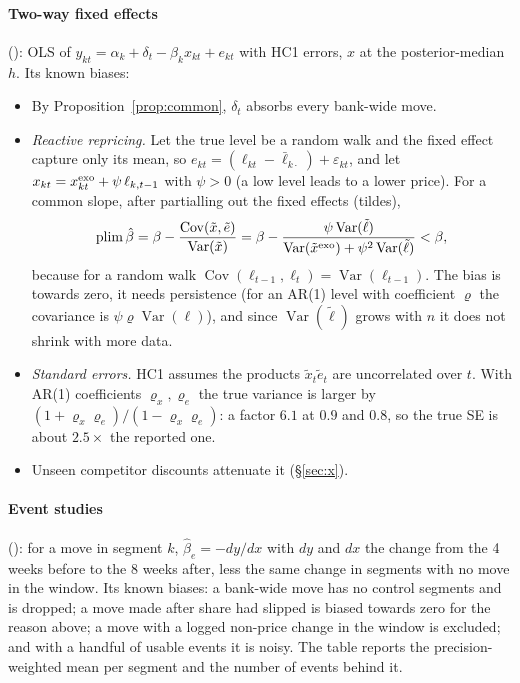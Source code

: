 \documentclass[11pt,a4paper]{article}
\theoremstyle{remark}
\newcommand{\code}[1]{\texttt{\detokenize{#1}}}
\newcommand{\Var}{\operatorname{Var}}
\newcommand{\Cov}{\operatorname{Cov}}
\newcommand{\plim}{\operatorname*{plim}}
\begin{document}
\paragraph{Two-way fixed effects} (\code{fe.fit_twfe}): OLS of
$y_{kt}=\alpha_k+\delta_t-\beta_kx_{kt}+e_{kt}$ with HC1 errors, $x$ at the posterior-median $h$.
Its known biases:
\begin{itemize}
\item By Proposition~\ref{prop:common}, $\delta_t$ absorbs every bank-wide move.
\item \emph{Reactive repricing.} Let the true level be a random walk and the fixed effect capture
only its mean, so $e_{kt}=(\ell_{kt}-\bar\ell_{k\cdot})+\varepsilon_{kt}$, and let
$x_{kt}=x^{\rm exo}_{kt}+\psi\,\ell_{k,t-1}$ with $\psi>0$ (a low level leads to a lower price). For
a common slope, after partialling out the fixed effects (tildes),
\[
\plim\hat\beta=\beta-\frac{\Cov(\tilde x,\tilde e)}{\Var(\tilde x)}
=\beta-\frac{\psi\Var(\tilde\ell)}{\Var(\tilde x^{\rm exo})+\psi^2\Var(\tilde\ell)}<\beta ,
\]
because for a random walk $\Cov(\ell_{t-1},\ell_t)=\Var(\ell_{t-1})$. The bias is towards zero, it
needs persistence (for an AR(1) level with coefficient $\varrho$ the covariance is
$\psi\varrho\Var(\ell)$), and since $\Var(\tilde\ell)$ grows with $n$ it does not shrink with more data.
\item \emph{Standard errors.} HC1 assumes the products $\tilde x_t\tilde e_t$ are uncorrelated over
$t$. With AR(1) coefficients $\varrho_x,\varrho_e$ the true variance is larger by
$(1+\varrho_x\varrho_e)/(1-\varrho_x\varrho_e)$: a factor $6.1$ at $0.9$ and $0.8$, so the true SE
is about $2.5\times$ the reported one.
\item Unseen competitor discounts attenuate it (\S\ref{sec:x}).
\end{itemize}

\paragraph{Event studies} (\code{events.event_study}): for a move in segment $k$,
$\hat\beta_e=-dy/dx$ with $dy$ and $dx$ the change from the 4 weeks before to the 8 weeks after, less
the same change in segments with no move in the window. Its known biases: a bank-wide move has no
control segments and is dropped; a move made after share had slipped is biased towards zero for the
reason above; a move with a logged non-price change in the window is excluded; and with a handful
of usable events it is noisy. The table reports the precision-weighted mean per segment and the
number of events behind it.
\end{document}
